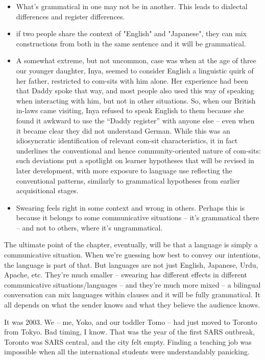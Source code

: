 \begin{itemize}
    \item What's grammatical in one may not be in another. This leads to dialectal differences and register differences.
    \item if two people share the context of "English" and "Japanese", they can mix constructions from both in the same sentence and it will be grammatical.
    \item A somewhat extreme, but not uncommon, case was when at the age of three our younger daughter, Inya, seemed to consider English a linguistic quirk of her father, restricted to com-sits with him alone. Her experience had been that Daddy spoke that way, and most people also used this way of speaking when interacting with him, but not in other situations. So, when our British in-laws came visiting, Inya refused to speak English to them because she found it awkward to use the ``Daddy register'' with anyone else -- even when it became clear they did not understand German. While this was an idiosyncratic identification of relevant com-sit characteristics, it in fact underlines the conventional and hence community-oriented nature of com-sits: such deviations put a spotlight on learner hypotheses that will be revised in later development, with more exposure to language use reflecting the conventional patterns, similarly to grammatical hypotheses from earlier acquisitional stages. \hfill\citep[42--43]{Wiese2023}
    \item Swearing feels right in some context and wrong in others. Perhaps this is because it belongs to some communicative situations -- it's grammatical there -- and not to others, where it's ungrammatical.
\end{itemize}






The ultimate point of the chapter, eventually, will be that a language is simply a communicative situation. When we're guessing how best to convey our intentions, the language is part of that. But languages are not just English, Japanese, Urdu, Apache, etc. They're much smaller -- swearing has different effects in different communicative situations/languages -- and they're much more mixed -- a bilingual conversation can mix languages within clauses and it will be fully grammatical. It all depends on what the sender knows and what they believe the audience knows.

It was 2003. We -- me, Yoko, and our toddler Tomo -- had just moved to Toronto from Tokyo. Bad timing, I know. That was the year of the first SARS outbreak, Toronto was SARS central, and  the city felt empty. Finding a teaching job was impossible when all the international students were understandably panicking.

